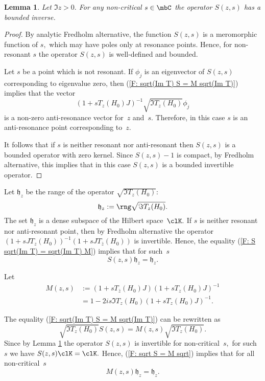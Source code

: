 \documentclass[11pt]{amsart}
\newtheorem{lemma}[thm]{Lemma}
\numberwithin{equation}{section}
\begin{document}
\begin{lemma} \label{L: S(z,s) is bdd for non-critical s}
Let $\Im z > 0.$ For any non-critical $s \in \mbC$ the operator $S(z,s)$ has a bounded inverse.
\end{lemma}
\begin{proof} By analytic Fredholm alternative, the function $S(z,s)$ is a meromorphic function of $s,$
which may have poles only at resonance points. Hence, for non-resonant $s$ the operator $S(z,s)$ is well-defined and bounded.

Let $s$ be a point which is not resonant.
If $\phi_j$ is an eigenvector of $S(z,s)$ corresponding to eigenvalue zero, then
(\ref{F: sqrt(Im T) S = M sqrt(Im T)}) implies that the vector
$$
  (1+s T_{z}(H_0)J)^{-1}\sqrt{\Im T_{z}(H_0)} \phi_j
$$
is a non-zero anti-resonance vector for~$z$ and~$s.$ Therefore, in this case $s$ is an anti-resonance point corresponding to~$z.$

It follows that if $s$ is neither resonant nor anti-resonant then $S(z,s)$ is a bounded operator with zero kernel.
Since $S(z,s)-1$ is compact, by Fredholm alternative, this implies that in this case  $S(z,s)$ is a bounded invertible operator.
\end{proof}

Let ${\mathfrak h_z}$ be the range of the operator $\sqrt{\Im T_{z}(H_0)}:$
$$
  {\mathfrak h_z} := \rng \sqrt{\Im T_{z}(H_0)}.
$$
The set ${\mathfrak h_z}$ is a dense subspace of the Hilbert space~$\clK.$
If $s$ is neither resonant nor anti-resonant point, then by Fredholm alternative
the operator $(1+s J T_{z}(H_0))^{-1} (1+s J T_{\bar z}(H_0))$ is invertible.
Hence, the equality (\ref{F: S sqrt(Im T) = sqrt(Im T) M})
implies that for such~$s$
$$
  S(z,s) {\mathfrak h_z} = {\mathfrak h_z}.
$$

Let
\begin{equation} \label{F: M-function}
  \begin{split}
     M(z,s) & := (1+s T_{\bar z}(H_0)J)(1+s T_{z}(H_0)J)^{-1} \\
       & = 1 - 2is \Im T_z(H_0)(1+s T_{z}(H_0)J)^{-1}.
  \end{split}
\end{equation}

The equality (\ref{F: sqrt(Im T) S = M sqrt(Im T)}) can be rewritten as
\begin{equation} \label{F: sqrt S = M sqrt}
  \sqrt{\Im T_{z}(H_0)} S(z,s) = M(z,s) \sqrt{\Im T_{z}(H_0)}.
\end{equation}
Since by Lemma \ref{L: S(z,s) is bdd for non-critical s} the operator $S(z,s)$ is invertible for non-critical~$s,$ for such $s$ we have $S(z,s)\clK = \clK.$
Hence, (\ref{F: sqrt S = M sqrt}) implies that for all non-critical~$s$
\begin{equation*} \label{F: M(z,s)euE(z)=euE(z)}
  M(z,s) {\mathfrak h_z} = {\mathfrak h_z}.
\end{equation*}
\end{document}
